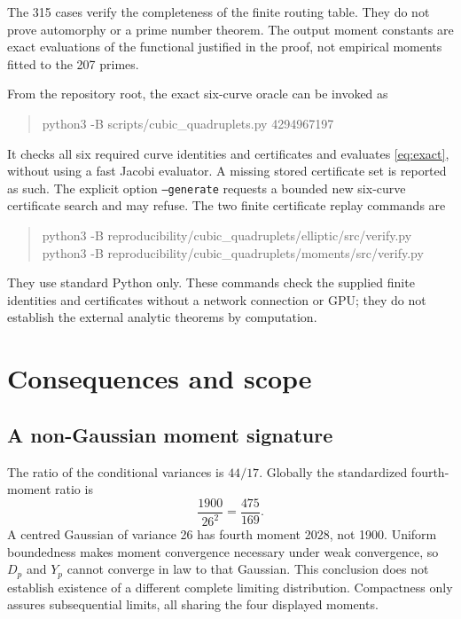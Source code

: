 \documentclass[11pt]{article}
\theoremstyle{definition}\newtheorem{definition}[theorem]{Definition}
\begin{document}
The 315 cases verify the completeness of
the finite routing table. They do not
prove automorphy or a prime number
theorem. The output moment constants
are exact evaluations of the functional
justified in the proof, not empirical
moments fitted to the 207 primes.

From the repository root, the exact
six-curve oracle can be invoked as
\begin{quote}\ttfamily\small
python3 -B scripts/cubic\_quadruplets.py 4294967197
\end{quote}
It checks all six required curve identities
and certificates and evaluates
\eqref{eq:exact}, without using a fast
Jacobi evaluator. A missing stored
certificate set is reported as such.
The explicit option \texttt{--generate}
requests a bounded new six-curve
certificate search and may refuse.
The two finite certificate replay commands are
\begin{quote}\ttfamily\small
python3 -B reproducibility/cubic\_quadruplets/elliptic/src/verify.py\\
python3 -B reproducibility/cubic\_quadruplets/moments/src/verify.py
\end{quote}
They use standard Python only. These commands check the supplied finite
identities and certificates without a network connection or GPU; they
do not establish the external analytic theorems by computation.

\section{Consequences and scope}
\subsection{A non-Gaussian moment signature}
The ratio of the conditional variances
is $44/17$. Globally the standardized
fourth-moment ratio is
\[
 \frac{1900}{26^2}=\frac{475}{169}.
\]
A centred Gaussian of variance 26 has
fourth moment 2028, not 1900.
Uniform boundedness makes moment
convergence necessary under weak
convergence, so $D_p$ and $Y_p$ cannot
converge in law to that Gaussian.
This conclusion does not establish
existence of a different complete
limiting distribution. Compactness
only assures subsequential limits,
all sharing the four displayed moments.
\end{document}
